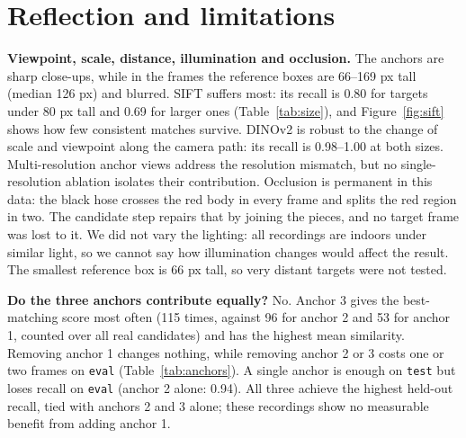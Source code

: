 \documentclass[11pt,a4paper]{article}
\begin{document}
\section{Reflection and limitations}
\textbf{Viewpoint, scale, distance, illumination and occlusion.} The anchors are sharp close-ups, while in the frames the reference boxes are 66--169 px tall (median 126 px) and blurred.
SIFT suffers most: its recall is 0.80 for targets under 80 px tall and 0.69 for larger ones (Table~\ref{tab:size}), and Figure~\ref{fig:sift} shows how few consistent matches survive.
DINOv2 is robust to the change of scale and viewpoint along the camera path: its recall is 0.98--1.00 at both sizes. Multi-resolution anchor views address the resolution mismatch, but no single-resolution ablation isolates their contribution.
Occlusion is permanent in this data: the black hose crosses the red body in every frame and splits the red region in two. The candidate step repairs that by joining the pieces, and no target frame was lost to it. We did not vary the lighting: all recordings are indoors under similar light, so we cannot say how illumination changes would affect the result. The smallest reference box is 66 px tall, so very distant targets were not tested.

\begin{table}[htbp]\centering\small

\caption{Share of target frames found, by height of the reference box (both sequences pooled, thresholds from \texttt{test}).}\label{tab:size}
\end{table}

\textbf{Do the three anchors contribute equally?} No. Anchor 3 gives the best-matching score most often (115 times, against 96 for anchor 2 and 53 for anchor 1, counted over all real candidates) and has the highest mean similarity. Removing anchor 1 changes nothing, while removing anchor 2 or 3 costs one or two frames on \texttt{eval} (Table~\ref{tab:anchors}).
A single anchor is enough on \texttt{test} but loses recall on \texttt{eval} (anchor 2 alone: 0.94). All three achieve the highest held-out recall, tied with anchors 2 and 3 alone; these recordings show no measurable benefit from adding anchor 1.

\begin{table}[htbp]\centering\small

\caption{Final system with fewer anchors (threshold re-chosen on \texttt{test} each time). P = precision, R = recall.}\label{tab:anchors}
\end{table}
\end{document}
